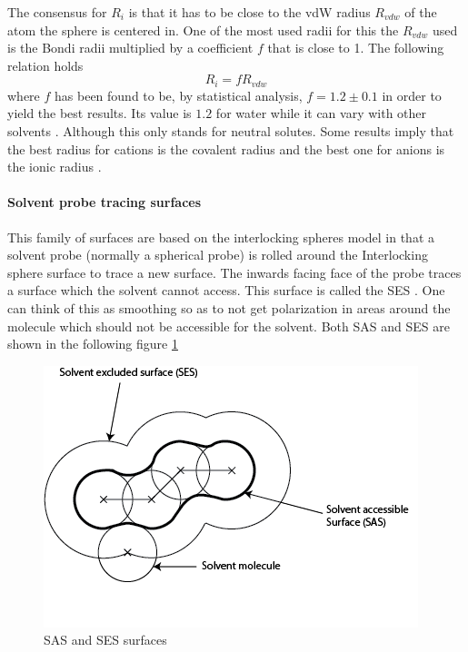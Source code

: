 \documentclass[../master_thesis.tex]{subfiles}
\begin{document}
The consensus for $R_i$ is that it has to be close to the \ac{vdW} radius
$R_{vdw}$ of the atom the sphere is centered in. One of the most used radii for
this  the $R_{vdw}$ used is the Bondi radii \cite{doi:10.1021/j100785a001,
Tomasi:2005ipa} multiplied by a coefficient $f$ that is close to 1. The
following relation holds
\cite{Tomasi:1994wt}
\begin{equation}
  R_i = fR_{vdw}
\end{equation}
where $f$ has been found to be, by statistical analysis, $f = 1.2 \pm 0.1$ in order to
yield the best results. Its value is $1.2$ for water while it can vary with
other solvents \cite{Tomasi:1994wt}. Although this only stands for neutral
solutes. Some results imply that the best radius for cations is the covalent
radius and the best one for anions is the ionic radius \cite{Tomasi:1994wt}.
\paragraph{Solvent probe tracing surfaces}\label{Spts}
This family of surfaces are based on the interlocking spheres model in that a
solvent probe (normally a spherical probe) is rolled around the Interlocking
sphere surface to trace a new surface. The inwards facing face of the probe traces a surface
which the solvent cannot access. This surface is called the \ac{SES}
\cite{Tomasi:2005ipa, Mennucci:2018}.  One can think of this as
smoothing so as to not get polarization in areas around the molecule which should
not be accessible for the solvent. Both SAS and \ac{SES} are shown in the following
figure \ref{fig:SASSEShomemade}
\begin{figure}[ht]
  \includegraphics[width=\linewidth]{img/SASSES.png}
  \caption{SAS and SES surfaces}
  \label{fig:SASSEShomemade}
\end{figure}
\end{document}
